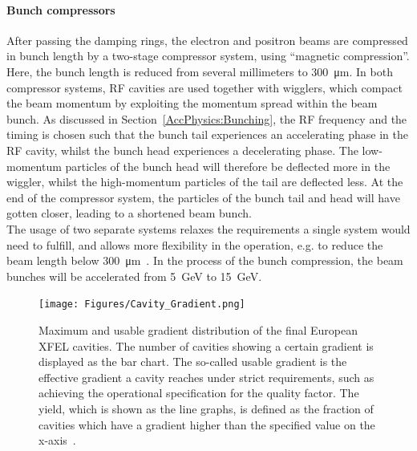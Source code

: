 \paragraph{Bunch compressors}
After passing the damping rings, the electron and positron beams are compressed in bunch length by a two-stage compressor system, using ``magnetic compression''.
Here, the bunch length is reduced from several millimeters to \SI{300}{\micro\meter}.
In both compressor systems, RF cavities are used together with wigglers, which compact the beam momentum by exploiting the momentum spread within the beam bunch.
As discussed in Section~\ref{AccPhysics:Bunching}, the RF frequency and the timing is chosen such that the bunch tail experiences an accelerating phase in the RF cavity, whilst the bunch head experiences a decelerating phase.
The low-momentum particles of the bunch head will therefore be deflected more in the wiggler, whilst the high-momentum particles of the tail are deflected less.
At the end of the compressor system, the particles of the bunch tail and head will have gotten closer, leading to a shortened beam bunch. 
\\The usage of two separate systems relaxes the requirements a single system would need to fulfill, and allows more flexibility in the operation, e.g. to reduce the beam length below \SI{300}{\micro\meter}~\cite[p. 124]{TDR32}.
In the process of the bunch compression, the beam bunches will be accelerated from \SI{5}{\GeV} to \SI{15}{\GeV}.

\begin{figure}[h!]
\centering
\texttt{[image: Figures/Cavity\_Gradient.png]}
\caption[Histogram of the occuring XFEL cavity gradients]{Maximum and usable gradient distribution of the final European XFEL cavities.
The number of cavities showing a certain gradient is displayed as the bar chart.
The so-called usable gradient is the effective gradient a cavity reaches under strict requirements, such as achieving the operational specification for the quality factor.
The yield, which is shown as the line graphs, is defined as the fraction of cavities which have a gradient higher than the specified value on the x-axis~\cite[p. 18]{XFEL_Cavities}.}
\label{fig:XFEL_cav}
\end{figure}

